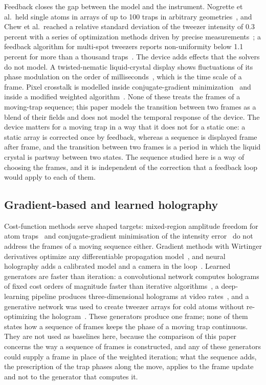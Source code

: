 Feedback closes the gap between the model and the instrument. Nogrette et al.\ held single atoms in arrays of up to 100 traps in arbitrary geometries~\cite{nogrette}, and Chew et al.\ reached a relative standard deviation of the tweezer intensity of 0.3 percent with a series of optimization methods driven by precise measurements~\cite{chew}; a feedback algorithm for multi-spot tweezers reports non-uniformity below 1.1 percent for more than a thousand traps~\cite{wang}. The device adds effects that the solvers do not model. A twisted-nematic liquid-crystal display shows fluctuations of its phase modulation on the order of milliseconds~\cite{lizana}, which is the time scale of a frame. Pixel crosstalk is modelled inside conjugate-gradient minimization~\cite{schroff} and inside a modified weighted algorithm~\cite{persson}. None of these treats the frames of a moving-trap sequence; this paper models the transition between two frames as a blend of their fields and does not model the temporal response of the device. The device matters for a moving trap in a way that it does not for a static one: a static array is corrected once by feedback, whereas a sequence is displayed frame after frame, and the transition between two frames is a period in which the liquid crystal is partway between two states. The sequence studied here is a way of choosing the frames, and it is independent of the correction that a feedback loop would apply to each of them.

\subsection{Gradient-based and learned holography}

Cost-function methods serve shaped targets: mixed-region amplitude freedom for atom traps~\cite{pasienski} and conjugate-gradient minimisation of the intensity error~\cite{harte} do not address the frames of a moving sequence either. Gradient methods with Wirtinger derivatives optimize any differentiable propagation model~\cite{chakravarthula}, and neural holography adds a calibrated model and a camera in the loop~\cite{peng}. Learned generators are faster than iteration: a convolutional network computes holograms of fixed cost orders of magnitude faster than iterative algorithms~\cite{eybposh}, a deep-learning pipeline produces three-dimensional holograms at video rates~\cite{shi}, and a generative network was used to create tweezer arrays for cold atoms without re-optimizing the hologram~\cite{ren}. These generators produce one frame; none of them states how a sequence of frames keeps the phase of a moving trap continuous. They are not used as baselines here, because the comparison of this paper concerns the way a sequence of frames is constructed, and any of these generators could supply a frame in place of the weighted iteration; what the sequence adds, the prescription of the trap phases along the move, applies to the frame update and not to the generator that computes it.

